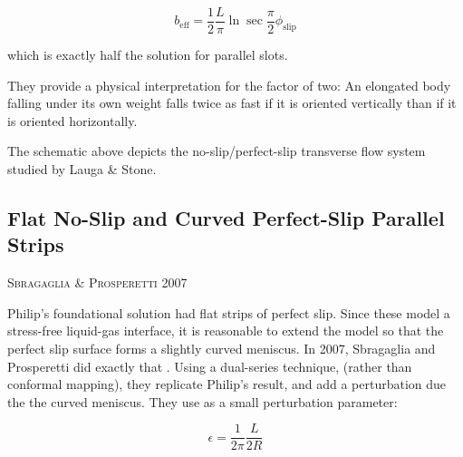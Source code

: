 \documentclass[a4paper]{report}
\newcommand{\beff}{\ensuremath{b_{\mathrm{eff}}}}
\newcommand{\phislip}{\ensuremath{\phi_{\mathrm{slip}}}}
\newcommand{\paper}[1]
         {\colorbox[gray]{0.8}{ \textsc{#1}}
         
         }
\begin{document}
\[ \beff= \frac{1}{2} \frac{L}{\pi}	\ln \sec \frac{\pi}{2} \phislip \]

which is exactly half the solution for parallel slots.

They provide a physical interpretation for the factor of two: An elongated body falling under its own weight falls twice as fast if it is oriented vertically than if it is oriented horizontally.

\begin{center}
\end{center}

The schematic above depicts the no-slip/perfect-slip transverse flow system studied by Lauga \& Stone.


\subsection*{Flat No-Slip and Curved Perfect-Slip Parallel Strips}

\paper{Sbragaglia \& Prosperetti 2007}
Philip's foundational solution had flat strips of perfect slip.  Since these model a stress-free liquid-gas interface, it is reasonable to extend the model so that the perfect slip surface forms a slightly curved meniscus.  In 2007, Sbragaglia and Prosperetti did exactly that \cite{SbragagliaProsperetti2007}.  Using a dual-series technique, (rather than conformal mapping), they replicate Philip's result, and add a perturbation due the the curved meniscus.  They use as a small perturbation parameter:

\[ \epsilon = \frac{1}{2\pi} \frac{L}{2R} \]
\end{document}
